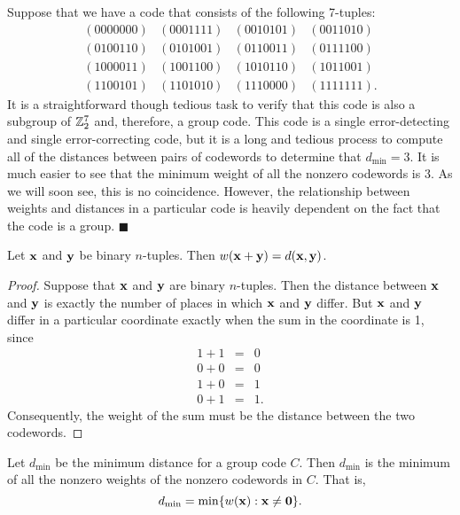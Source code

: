  
Suppose that we have a code that consists of the following 7-tuples: 
\[
\begin{array}{cccc}
(0000000) & (0001111) & (0010101) & (0011010) \\
(0100110) & (0101001) & (0110011) & (0111100) \\
(1000011) & (1001100) & (1010110) & (1011001) \\
(1100101) & (1101010) & (1110000) & (1111111).
\end{array}
\]
It is a straightforward though tedious task to verify that this code
is also a subgroup of ${\Bbb Z}_2^7$ and, therefore, a group code.
This code is a single error-detecting and single error-correcting 
code, but
it is a long and tedious process to compute all of the distances
between  pairs of codewords to determine that $d_{\min} = 3$. It is
much easier to see that the minimum weight of all the nonzero
codewords is 3. As we will soon see, this is no coincidence.
However, the relationship between weights and distances in a
particular code is heavily dependent on the fact that the code is a
group. 
\hspace{\fill} $\blacksquare$
 
 
\begin{lemma}
Let ${\bold x}$ and ${\bold y}$ be  binary $n$-tuples. Then $w({\bold
x} + {\bold y}) = d({\bold x}, {\bold y})$. 
\end{lemma}
 
 
\begin{proof}
Suppose that ${\bold x}$ and ${\bold y}$ are binary $n$-tuples. Then
the distance between ${\bold x}$ and ${\bold y}$ is exactly the number
of places in which ${\bold x}$ and ${\bold y}$ differ. But ${\bold x}$
and ${\bold y}$ differ in a particular coordinate exactly when the sum
in the coordinate is 1, since
\begin{eqnarray*}
1 + 1 & = & 0 \\
0 + 0 & = & 0 \\
1 + 0 & = & 1 \\
0 + 1 & = & 1.
\end{eqnarray*}
Consequently, the weight of the sum must be the distance between the two
codewords.
\end{proof}
 
 
\begin{theorem}
Let $d_{\min}$ be the minimum distance for a group code $C$. Then
$d_{\min}$ is the minimum of all the nonzero weights of the nonzero
codewords in $C$. That is, 
\[
d_{\min} = \min\{ w({\bold x}) : { {\bold x} \neq {\bold 0}
} \}.
\]
\end{theorem}
 

